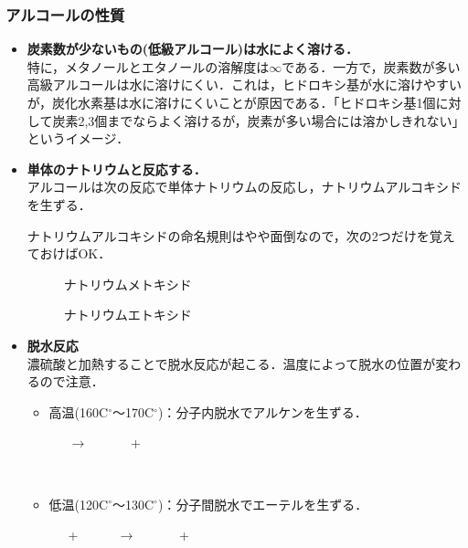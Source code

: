 \documentclass[a4paper,12pt]{ltjsreport}
\begin{document}
\subsubsection*{アルコールの性質}
\begin{itemize}
    \item\textbf{ 炭素数が少ないもの(低級アルコール)は水によく溶ける．}\\
    特に，メタノールとエタノールの溶解度は$\infty$である．一方で，炭素数が多い高級アルコールは水に溶けにくい．これは，ヒドロキシ基が水に溶けやすいが，炭化水素基は水に溶けにくいことが原因である．{\color{red}「ヒドロキシ基1個に対して炭素2,3個までならよく溶けるが，炭素が多い場合には溶かしきれない」}というイメージ．
    \item\textbf{単体のナトリウムと反応する．}\\
    アルコールは次の反応で単体ナトリウムの反応し，{\color{red}ナトリウムアルコキシド}を生ずる．
    {\centerline{}}
    ナトリウムアルコキシドの命名規則はやや面倒なので，次の2つだけを覚えておけばOK．\\\noindent
    \begin{minipage}{0.5\linewidth}
\begin{figure}[H]
\centering
{}
\caption{ナトリウムメトキシド}
\end{figure}

\end{minipage}
\begin{minipage}{0.5\linewidth}
\begin{figure}[H]
\centering
{}
\caption{ナトリウムエトキシド}
\end{figure}

\end{minipage}
\item \textbf{脱水反応}\\
濃硫酸と加熱することで脱水反応が起こる．温度によって脱水の位置が変わるので注意．
\begin{itemize}
    \item 高温(160C$^\circ$〜170C$^\circ$)：{\color{red}分子内脱水}でアルケンを生ずる．\\[5pt]
    \centerline{
    ~~~$\longrightarrow$~~~ ~~~+~~~}\\
    \item  低温(120C$^\circ$〜130C$^\circ$)：{\color{red}分子間脱水}でエーテルを生ずる．\\
    \centerline{
    ~~~+~~~~~~$\longrightarrow$~~~ ~~~+~~~}
\end{itemize}
\end{itemize}
\newpage
\end{document}
